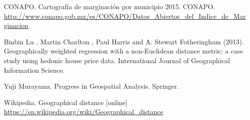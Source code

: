 \documentclass[12pt,letterpaper]{article}
\begin{document}
\begin{thebibliography}{2}

 CONAPO. Cartografía de marginación por municipio 2015. CONAPO. \url{http://www.conapo.gob.mx/es/CONAPO/Datos_Abiertos_del_Indice_de_Marginacion}

 Binbin Lu , Martin Charlton , Paul Harris and A. Stewart Fotheringham (2013). Geographically weighted regression with a non-Euclidean distance metric: a case study using hedonic house price data. International Journal of Geographical Information Science.

  Yuji Murayama. Progress in Geospatial Analysis. Springer.


 Wikipedia. Geographical distance [online] \url{https://en.wikipedia.org/wiki/Geographical_distance}  

\end{thebibliography}
\end{document}
